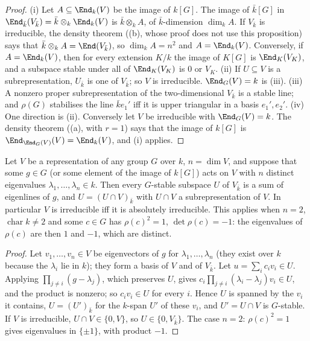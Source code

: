 \begin{proof}
(i) Let $A\subseteq\End_k(V)$ be the image of $k[G]$. The image of $\bar k[G]$ in $\End_{\bar k}(V_{\bar k})=\bar k\otimes_k\End_k(V)$ is $\bar k\otimes_kA$, of
$\bar k$-dimension $\dim_kA$. If $V_{\bar k}$ is irreducible, the density theorem ((b), whose proof does not use this
proposition) says that $\bar k\otimes_kA=\End(V_{\bar k})$, so $\dim_kA=n^2$ and $A=\End_k(V)$. Conversely, if $A=\End_k(V)$, then for every
extension $K/k$ the image of $K[G]$ is $\End_K(V_K)$, and a subspace stable under all of $\End_K(V_K)$ is $0$ or $V_K$.
(ii) If $U\subseteq V$ is a subrepresentation, $U_{\bar k}$ is one of $V_{\bar k}$; so $V$ is irreducible. $\End_G(V)=k$ is (iii).
(iii) A nonzero proper subrepresentation of the two-dimensional $V_{\bar k}$ is a stable line; and $\rho(G)$ stabilises the line $\bar ke_1'$ iff it is
upper triangular in a basis $e_1',e_2'$.
(iv) One direction is (ii). Conversely let $V$ be irreducible with $\End_G(V)=k$. The density theorem ((a), with
$r=1$) says that the image of $k[G]$ is $\End_{\End_G(V)}(V)=\End_k(V)$, and (i) applies.
\end{proof}

\begin{proposition}\label{prop:reps:distinct-eigenvalues}
Let $V$ be a representation of any group $G$ over $k$, $n=\dim V$, and suppose that some $g\in G$ (or some element of the image of
$k[G]$) acts on $V$ with $n$ distinct eigenvalues $\lambda_1,\dots,\lambda_n\in k$. Then every $G$-stable subspace $U$ of $V_{\bar k}$ is a sum of
eigenlines of $g$, and $U=(U\cap V)_{\bar k}$ with $U\cap V$ a subrepresentation of $V$. In particular $V$ is irreducible iff it is absolutely
irreducible. This applies when $n=2$, $\operatorname{char}k\ne2$ and some $c\in G$ has $\rho(c)^2=1$, $\det\rho(c)=-1$: the eigenvalues of $\rho(c)$ are
then $1$ and $-1$, which are distinct.
\end{proposition}

\begin{proof}
Let $v_1,\dots,v_n\in V$ be eigenvectors of $g$ for $\lambda_1,\dots,\lambda_n$ (they exist over $k$ because the $\lambda_i$ lie in $k$); they form a basis of $V$
and of $V_{\bar k}$. Let $u=\sum_ic_iv_i\in U$. Applying $\prod_{j\ne i}(g-\lambda_j)$, which preserves $U$, gives $c_i\prod_{j\ne i}(\lambda_i-\lambda_j)v_i\in U$, and
the product is nonzero; so $c_iv_i\in U$ for every $i$. Hence $U$ is spanned by the $v_i$ it contains, $U=(U')_{\bar k}$ for the $k$-span $U'$
of these $v_i$, and $U'=U\cap V$ is $G$-stable. If $V$ is irreducible, $U\cap V\in\{0,V\}$, so $U\in\{0,V_{\bar k}\}$. The case $n=2$: $\rho(c)^2=1$
gives eigenvalues in $\{\pm1\}$, with product $-1$.
\end{proof}


